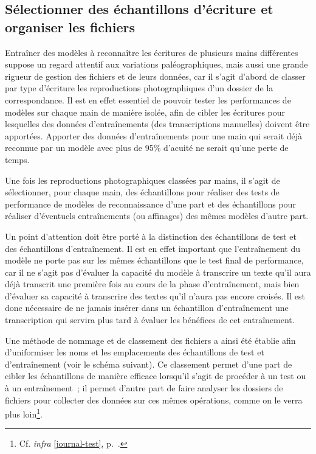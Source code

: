 \documentclass[a4paper,12pt,twoside]{book}
\begin{document}
			\subsection{Sélectionner des échantillons d'écriture et organiser les fichiers}
				Entraîner des modèles à reconnaître les écritures de plusieurs mains différentes suppose un regard attentif aux variations paléographiques, mais aussi une grande rigueur de gestion des fichiers et de leurs données, car il s'agit d'abord de classer par type d'écriture les reproductions photographiques d'un dossier de la correspondance. Il est en effet essentiel de pouvoir tester les performances de modèles sur chaque main de manière isolée, afin de cibler les écritures pour lesquelles des données d'entraînements (des transcriptions manuelles) doivent être apportées. Apporter des données d'entraînements pour une main qui serait déjà reconnue par un modèle avec plus de 95\% d'acuité ne serait qu'une perte de temps.
				
				Une fois les reproductions photographiques classées par mains, il s'agit de sélectionner, pour chaque main, des échantillons pour réaliser des tests de performance de modèles de reconnaissance d'une part et des échantillons pour réaliser d'éventuels entraînements (ou affinages) des mêmes modèles d'autre part.
				
				Un point d'attention doit être porté à la distinction des échantillons de test et des échantillons d'entraînement. Il est en effet important que l'entraînement du modèle ne porte pas sur les mêmes échantillons que le test final de performance, car il ne s'agit pas d'évaluer la capacité du modèle à transcrire un texte qu'il aura déjà transcrit une première fois au cours de la phase d'entraînement, mais bien d'évaluer sa capacité à transcrire des textes qu'il n'aura pas encore croisés. Il est donc nécessaire de ne jamais insérer dans un échantillon d'entraînement une transcription qui servira plus tard à évaluer les bénéfices de cet entraînement.
				
				Une méthode de nommage et de classement des fichiers a ainsi été établie afin d'uniformiser les noms et les emplacements des échantillons de test et d'entraînement (voir le schéma suivant). Ce classement permet d'une part de cibler les échantillons de manière efficace lorsqu'il s'agit de procéder à un test ou à un entraînement~; il permet d'autre part de faire analyser les dossiers de fichiers pour collecter des données sur ces mêmes opérations, comme on le verra plus loin\footnote{Cf. \textit{infra} \ref{journal-test}, p.~\pageref{journal-test}.}.
				
\end{document}
